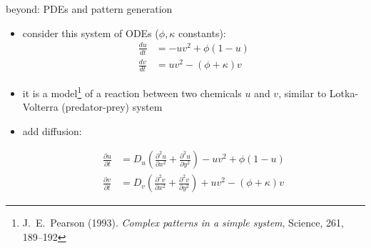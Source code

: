 \documentclass[urlcolor=blue,dvipsnames]{beamer}
\begin{document}
\begin{frame}{beyond: PDEs and pattern generation}

\small
\begin{itemize}
\item consider this system of ODEs ($\phi,\kappa$ constants):
\scriptsize
\begin{align*}
\frac{du}{dt} &= -uv^2+\phi(1-u) \\
\frac{dv}{dt} &= uv^2-(\phi+\kappa)v
\end{align*}
\small
\item it is a model\footnote{\tiny J.~E.~Pearson (1993). \emph{Complex patterns in a simple system}, Science, 261, 189--192} of a reaction between two chemicals $u$ and $v$, similar to Lotka-Volterra (predator-prey) system
\item add diffusion:

\vspace{-10mm}
\scriptsize
\begin{align*}
\frac{\partial u}{\partial t} &= D_u \left(\frac{\partial^2 u}{\partial x^2} + \frac{\partial^2 u}{\partial y^2}\right) -uv^2+\phi(1-u) \\
\frac{\partial v}{\partial t} &= D_v \left(\frac{\partial^2 v}{\partial x^2} + \frac{\partial^2 v}{\partial y^2}\right) + uv^2-(\phi+\kappa)v
\end{align*}
\small
\end{itemize}


\end{frame}
\end{document}
